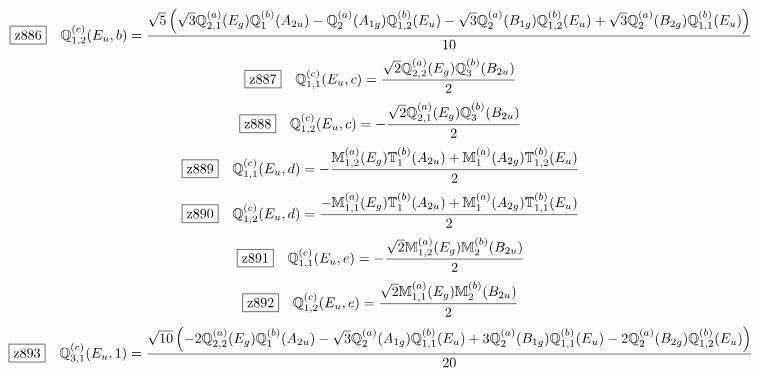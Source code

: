\documentclass[fleqn,10pt,landscape]{jsarticle}
\begin{document}
\begin{dmath*}
\hspace*{3mm}\fbox{z886}\quad \mathbb{Q}_{1,2}^{(c)}(E_{u},b)=\frac{\sqrt{5} \left(\sqrt{3} \mathbb{Q}_{2,1}^{(a)}(E_{g}) \mathbb{Q}_{1}^{(b)}(A_{2u}) - \mathbb{Q}_{2}^{(a)}(A_{1g}) \mathbb{Q}_{1,2}^{(b)}(E_{u}) - \sqrt{3} \mathbb{Q}_{2}^{(a)}(B_{1g}) \mathbb{Q}_{1,2}^{(b)}(E_{u}) + \sqrt{3} \mathbb{Q}_{2}^{(a)}(B_{2g}) \mathbb{Q}_{1,1}^{(b)}(E_{u})\right)}{10}
\end{dmath*}
\begin{dmath*}
\hspace*{3mm}\fbox{z887}\quad \mathbb{Q}_{1,1}^{(c)}(E_{u},c)=\frac{\sqrt{2} \mathbb{Q}_{2,2}^{(a)}(E_{g}) \mathbb{Q}_{3}^{(b)}(B_{2u})}{2}
\end{dmath*}
\begin{dmath*}
\hspace*{3mm}\fbox{z888}\quad \mathbb{Q}_{1,2}^{(c)}(E_{u},c)=- \frac{\sqrt{2} \mathbb{Q}_{2,1}^{(a)}(E_{g}) \mathbb{Q}_{3}^{(b)}(B_{2u})}{2}
\end{dmath*}
\begin{dmath*}
\hspace*{3mm}\fbox{z889}\quad \mathbb{Q}_{1,1}^{(c)}(E_{u},d)=- \frac{\mathbb{M}_{1,2}^{(a)}(E_{g}) \mathbb{T}_{1}^{(b)}(A_{2u}) + \mathbb{M}_{1}^{(a)}(A_{2g}) \mathbb{T}_{1,2}^{(b)}(E_{u})}{2}
\end{dmath*}
\begin{dmath*}
\hspace*{3mm}\fbox{z890}\quad \mathbb{Q}_{1,2}^{(c)}(E_{u},d)=\frac{- \mathbb{M}_{1,1}^{(a)}(E_{g}) \mathbb{T}_{1}^{(b)}(A_{2u}) + \mathbb{M}_{1}^{(a)}(A_{2g}) \mathbb{T}_{1,1}^{(b)}(E_{u})}{2}
\end{dmath*}
\begin{dmath*}
\hspace*{3mm}\fbox{z891}\quad \mathbb{Q}_{1,1}^{(c)}(E_{u},e)=- \frac{\sqrt{2} \mathbb{M}_{1,2}^{(a)}(E_{g}) \mathbb{M}_{2}^{(b)}(B_{2u})}{2}
\end{dmath*}
\begin{dmath*}
\hspace*{3mm}\fbox{z892}\quad \mathbb{Q}_{1,2}^{(c)}(E_{u},e)=\frac{\sqrt{2} \mathbb{M}_{1,1}^{(a)}(E_{g}) \mathbb{M}_{2}^{(b)}(B_{2u})}{2}
\end{dmath*}
\begin{dmath*}
\hspace*{3mm}\fbox{z893}\quad \mathbb{Q}_{3,1}^{(c)}(E_{u},1)=\frac{\sqrt{10} \left(- 2 \mathbb{Q}_{2,2}^{(a)}(E_{g}) \mathbb{Q}_{1}^{(b)}(A_{2u}) - \sqrt{3} \mathbb{Q}_{2}^{(a)}(A_{1g}) \mathbb{Q}_{1,1}^{(b)}(E_{u}) + 3 \mathbb{Q}_{2}^{(a)}(B_{1g}) \mathbb{Q}_{1,1}^{(b)}(E_{u}) - 2 \mathbb{Q}_{2}^{(a)}(B_{2g}) \mathbb{Q}_{1,2}^{(b)}(E_{u})\right)}{20}
\end{dmath*}
\end{document}
